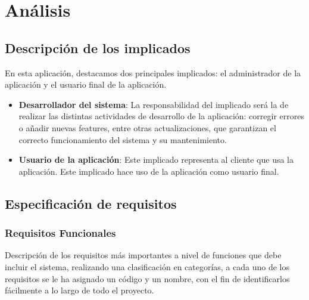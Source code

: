 
\chapter{Análisis}


\section{Descripción de los implicados} \label{implicados}

En esta aplicación, destacamos dos principales implicados: el administrador de la aplicación y el usuario final de la aplicación.

\begin{itemize}
	\item \textbf{Desarrollador del sistema}: La responsabilidad del implicado será la de realizar las distintas actividades de desarrollo de la aplicación: corregir errores o añadir nuevas features, entre otras actualizaciones, que garantizan el correcto funcionamiento del sistema y su mantenimiento.
	
	\item \textbf{Usuario de la aplicación}: Este implicado representa al cliente que usa la aplicación. Este implicado hace uso de la aplicación como usuario final.
\end{itemize}

\section{Especificación de requisitos}

\subsection{Requisitos Funcionales}

Descripción de los requisitos más importantes a nivel de funciones que debe incluir el sistema, realizando una clasificación en categorías, a cada uno de los requisitos se le ha asignado un código y un nombre, con el fin de identificarlos fácilmente a lo largo de todo el proyecto. 

